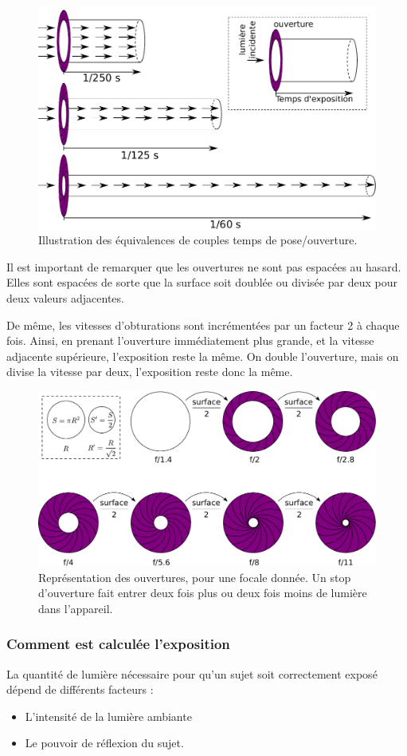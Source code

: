 \documentclass[a4paper,twoside]{article}
\begin{document}
\begin{figure}[htb]
\centering
\includegraphics[width=0.65\linewidth]{figure/exposition.pdf}
\caption{Illustration des équivalences de couples temps de pose/ouverture.}\label{fig:exposition-equivalente}
\end{figure}

\begin{remarque}
Il est important de remarquer que les ouvertures ne sont pas espacées au hasard. Elles sont espacées de sorte que la surface soit doublée ou divisée par deux pour deux valeurs adjacentes. 

De même, les vitesses d'obturations sont incrémentées par un facteur 2 à chaque fois. Ainsi, en prenant l'ouverture immédiatement plus grande, et la vitesse adjacente supérieure, l'exposition reste la même. On double l'ouverture, mais on divise la vitesse par deux, l'exposition reste donc la même.
\end{remarque}

\begin{figure}[htb]
\centering
\includegraphics[width=0.65\linewidth]{figure/aperture.pdf}
\caption{Représentation des ouvertures, pour une focale donnée. Un stop d'ouverture fait entrer deux fois plus ou deux fois moins de lumière dans l'appareil.}\label{fig:ouverture}
\end{figure}

\subsubsection{Comment est calculée l'exposition}
La quantité de lumière nécessaire pour qu'un sujet soit correctement exposé dépend de différents facteurs :
\begin{itemize}
\item L'intensité de la lumière ambiante
\item Le pouvoir de réflexion du sujet.
\end{itemize}
\end{document}
